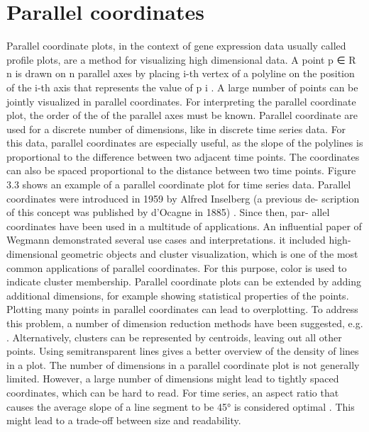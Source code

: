 \section{Parallel coordinates}
Parallel coordinate plots, in the context of gene expression data usually called profile
plots, are a method for visualizing high dimensional data. A point p ∈ R n is drawn on
n parallel axes by placing i-th vertex of a polyline on the position of the i-th axis that
represents the value of p i . A large number of points can be jointly visualized in parallel
coordinates. For interpreting the parallel coordinate plot, the order of the of the parallel
axes must be known. Parallel coordinate are used for a discrete number of dimensions,
like in discrete time series data. For this data, parallel coordinates are especially useful,
as the slope of the polylines is proportional to the difference between two adjacent time
points. The coordinates can also be spaced proportional to the distance between two
time points. Figure 3.3 shows an example of a parallel coordinate plot for time series
data.
Parallel coordinates were introduced in 1959 by Alfred Inselberg (a previous de-
scription of this concept was published by d’Ocagne in 1885) . Since then, par-
allel coordinates have been used in a multitude of applications. An influential paper
of Wegmann  demonstrated several use cases and interpretations. it included high-
dimensional geometric objects and cluster visualization, which is one of the most common
applications of parallel coordinates. For this purpose, color is used to indicate cluster
membership. Parallel coordinate plots can be extended by adding additional dimensions,
for example showing statistical properties of the points.
Plotting many points in parallel coordinates can lead to overplotting. To address
this problem, a number of dimension reduction methods have been suggested, e.g. .
Alternatively, clusters can be represented by centroids, leaving out all other points.
Using semitransparent lines gives a better overview of the density of lines in a plot. The
number of dimensions in a parallel coordinate plot is not generally limited. However, a
large number of dimensions might lead to tightly spaced coordinates, which can be hard
to read. For time series, an aspect ratio that causes the average slope of a line segment
to be 45° is considered optimal . This might lead to a trade-off between size and
readability.

